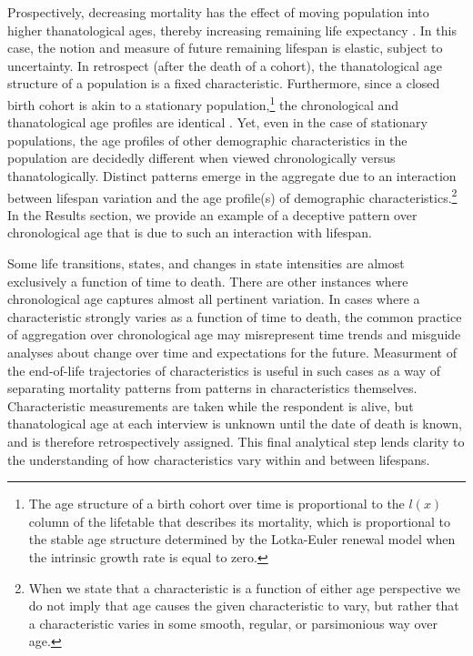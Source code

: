 \documentclass[11pt,oneside,a4paper]{article}
\begin{document}
Prospectively, decreasing mortality has the effect of moving population into higher thanatological ages, thereby increasing
remaining life expectancy \citep{sanderson2005average}. In this case,
the notion and measure of future remaining lifespan is elastic, subject to uncertainty.
In retrospect (after the death of a cohort), the thanatological age structure of
a population is a fixed characteristic. Furthermore, since a closed birth cohort
is akin to a stationary population,\footnote{The age structure of a birth cohort over time is proportional to the $l(x)$ column of the lifetable that describes its
mortality, which is proportional to the stable age structure determined by
the Lotka-Euler renewal model when the intrinsic growth rate is equal to zero.}
the chronological and thanatological age profiles are identical
\citep{brouard1989mouvements,vaupel2009life,rao2014generalization}. Yet, even in
the case of stationary populations, the age profiles of other demographic characteristics
in the population are decidedly different when viewed chronologically versus
thanatologically. Distinct patterns emerge in the aggregate due to an interaction between lifespan variation and the age profile(s) of
demographic characteristics.\footnote{When we state that a characteristic is
a function of either age perspective we do not imply that age causes the given characteristic to vary, but rather that a characteristic varies in some smooth, regular, or parsimonious
way over age.} In the Results section, we provide an example of a deceptive
pattern over chronological age that is due to such an interaction with lifespan.

Some life
transitions, states, and changes in state intensities are almost exclusively a
function of time to death. There are other instances where chronological age
captures almost all pertinent variation. In cases where a characteristic strongly varies as a
function of time to death,
the common practice of aggregation over chronological age may misrepresent time
trends and misguide analyses about change over time and expectations for the
future. Measurment of the
end-of-life trajectories of characteristics is useful in such cases as a way of separating
mortality patterns from patterns in characteristics themselves.
Characteristic measurements are taken while the respondent is alive, but
thanatological age at each interview is unknown until the date of death is
known, and is therefore retrospectively assigned. This final analytical step
lends clarity to the understanding of how characteristics vary within and
between lifespans.
\end{document}
